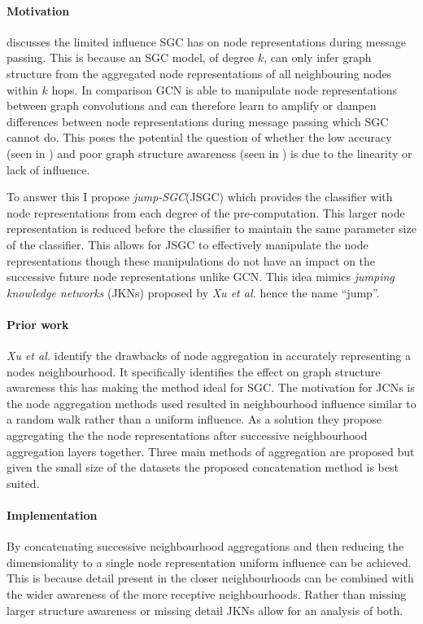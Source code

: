\paragraph{Motivation}
 discusses the limited influence SGC has on node representations during message passing.
This is because an SGC model, of degree $k$, can only infer graph structure from the aggregated node representations of all neighbouring nodes within $k$ hops.
In comparison GCN is able to manipulate node representations between graph convolutions and can therefore learn to amplify or dampen differences between node representations during message passing which SGC cannot do.
This poses the potential the question of whether the low accuracy (seen in ) and poor graph structure awareness (seen in ) is due to the linearity or lack of influence.

To answer this I propose \emph{jump-SGC}(JSGC) which provides the classifier with node representations from each degree of the pre-computation.
This larger node representation is reduced before the classifier to maintain the same parameter size of the classifier.
This allows for JSGC to effectively manipulate the node representations though these manipulations do not have an impact on the successive future node representations unlike GCN.
This idea mimics \emph{jumping knowledge networks} (JKNs) proposed by \textit{Xu et al.}\cite{xu2018representation} hence the name ``jump''.

\paragraph{Prior work}
\textit{Xu et al.}\cite{xu2018representation} identify the drawbacks of node aggregation in accurately representing a nodes neighbourhood.
It specifically identifies the effect on graph structure awareness this has making the method ideal for SGC.
The motivation for JCNs is the node aggregation methods used resulted in neighbourhood influence similar to a random walk rather than a uniform influence.
As a solution they propose aggregating the the node representations after successive neighbourhood aggregation layers together.
Three main methods of aggregation are proposed but given the small size of the datasets the proposed concatenation method is best suited.

\paragraph{Implementation}
By concatenating successive neighbourhood aggregations and then reducing the dimensionality to a single node representation uniform influence can be achieved.
This is because detail present in the closer neighbourhoods can be combined with the wider awareness of the more receptive neighbourhoods.
Rather than missing larger structure awareness or missing detail JKNs allow for an analysis of both.

